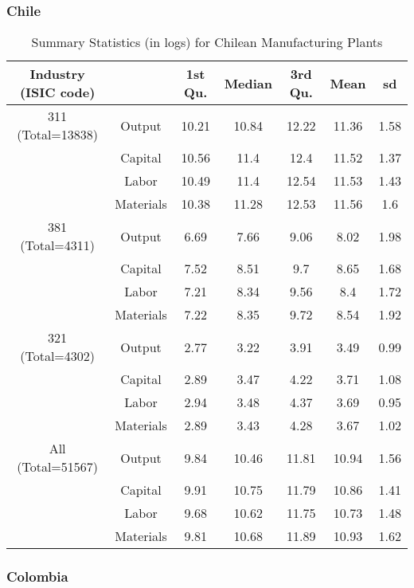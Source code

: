 \documentclass[11pt]{article}
\begin{document}
\subsubsection{Chile}

\begin{table}[H]
\centering
\caption{Summary Statistics (in logs) for Chilean Manufacturing Plants}
\begin{tabular}{ccccccc}
  \hline\hline Industry (ISIC code) &   & 1st Qu. & Median & 3rd Qu. & Mean & sd \\ 
  \hline
311 (Total=13838) & Output & 10.21 & 10.84 & 12.22 & 11.36 & 1.58 \\ 
   & Capital & 10.56 & 11.4 & 12.4 & 11.52 & 1.37 \\ 
   & Labor & 10.49 & 11.4 & 12.54 & 11.53 & 1.43 \\ 
   & Materials & 10.38 & 11.28 & 12.53 & 11.56 & 1.6 \\ 
  381 (Total=4311) & Output & 6.69 & 7.66 & 9.06 & 8.02 & 1.98 \\ 
   & Capital & 7.52 & 8.51 & 9.7 & 8.65 & 1.68 \\ 
   & Labor & 7.21 & 8.34 & 9.56 & 8.4 & 1.72 \\ 
   & Materials & 7.22 & 8.35 & 9.72 & 8.54 & 1.92 \\ 
  321 (Total=4302) & Output & 2.77 & 3.22 & 3.91 & 3.49 & 0.99 \\ 
   & Capital & 2.89 & 3.47 & 4.22 & 3.71 & 1.08 \\ 
   & Labor & 2.94 & 3.48 & 4.37 & 3.69 & 0.95 \\ 
   & Materials & 2.89 & 3.43 & 4.28 & 3.67 & 1.02 \\ 
  All (Total=51567) & Output & 9.84 & 10.46 & 11.81 & 10.94 & 1.56 \\ 
   & Capital & 9.91 & 10.75 & 11.79 & 10.86 & 1.41 \\ 
   & Labor & 9.68 & 10.62 & 11.75 & 10.73 & 1.48 \\ 
   & Materials & 9.81 & 10.68 & 11.89 & 10.93 & 1.62 \\ 
   \hline
\end{tabular}
\label{CHLsum}
\end{table} 

\subsubsection{Colombia}
\end{document}
